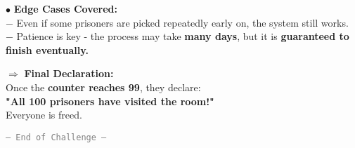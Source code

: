 \documentclass[fleqn]{article}
\begin{document}
{$\bullet$ \textbf{Edge Cases Covered:}
\vspace*{0.1cm} \\
$-$ Even if some prisoners are picked repeatedly early on, the system still works. \\
$-$ Patience is key - the process may take \textbf{many days}, but it is \textbf{guaranteed to finish eventually.}
\vspace*{0.2cm}

$\Rightarrow$ \textbf{Final Declaration:} 
\vspace*{0.1cm} \\
Once the \textbf{counter reaches 99}, they declare: \\
\hspace*{11pt} \textbf{"All 100 prisoners have visited the room!"} \\
Everyone is freed.
}


\vspace{1cm}
\begin{center}
    \textcolor{gray}{\large\texttt{--- End of Challenge ---}}
\end{center}
\vspace{1cm}
\end{document}
